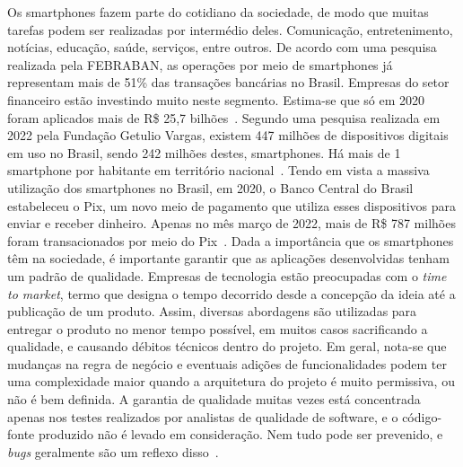 Os smartphones fazem parte do cotidiano da sociedade, de modo que muitas tarefas podem ser realizadas por intermédio deles.
Comunicação, entretenimento, notícias, educação, saúde, serviços, entre outros.
De acordo com uma pesquisa realizada pela FEBRABAN, as operações por meio de smartphones já representam mais de 51\% das transações bancárias no Brasil.
Empresas do setor financeiro estão investindo muito neste segmento.
Estima-se que só em 2020 foram aplicados mais de R\$ 25,7 bilhões~\cite{febraban-data}.
Segundo uma pesquisa realizada em 2022 pela Fundação Getulio Vargas, existem 447 milhões de dispositivos digitais em uso no Brasil, sendo 242 milhões destes, smartphones.
Há mais de 1 smartphone por habitante em território nacional~\cite{it-usage-data}.
Tendo em vista a massiva utilização dos smartphones no Brasil, em 2020, o Banco Central do Brasil estabeleceu o Pix, um novo meio de pagamento que utiliza esses dispositivos para enviar e receber dinheiro.
Apenas no mês março de 2022, mais de R\$ 787 milhões foram transacionados por meio do Pix~\cite{pix-statistics}.
Dada a importância que os smartphones têm na sociedade, é importante garantir que as aplicações desenvolvidas tenham um padrão de qualidade.
Empresas de tecnologia estão preocupadas com o \emph{time to market}, termo que designa o tempo decorrido desde a concepção da ideia até a publicação de um produto.
Assim, diversas abordagens são utilizadas para entregar o produto no menor tempo possível, em muitos casos sacrificando a qualidade, e causando débitos técnicos dentro do projeto.
Em geral, nota-se que mudanças na regra de negócio e eventuais adições de funcionalidades podem ter uma complexidade maior quando a arquitetura do projeto é muito permissiva, ou não é bem definida.
A garantia de qualidade muitas vezes está concentrada apenas nos testes realizados por analistas de qualidade de software, e o código-fonte produzido não é levado em consideração.
Nem tudo pode ser prevenido, e \emph{bugs} geralmente são um reflexo disso~\cite{quality-standards-paper}.
